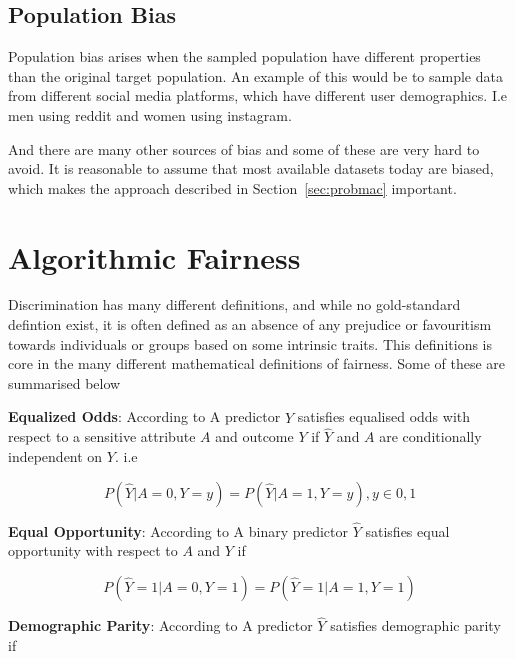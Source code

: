 \subsection{Population Bias}

Population bias arises when the sampled population have different properties than the original target population. \cite{Olteanu:2019:FDATA} An example of this would be to sample data from different social media platforms, which have different user demographics. I.e men using reddit and women using instagram.

And there are many other sources of bias and some of these are very hard to avoid. It is reasonable to assume that most available datasets today are biased, which makes the approach described in Section~\ref{sec:probmac} important.

\section{Algorithmic Fairness}

Discrimination has many different definitions, and while no gold-standard defintion exist, it is often defined as an absence of any prejudice or favouritism towards individuals or groups based on some intrinsic traits. \cite{Mehrabi:2021:CSUR, Nripsuta:2019:AIES} This definitions is core in the many different mathematical definitions of fairness. Some of these are summarised below

\textbf{Equalized Odds}: According to \citet{Mehrabi:2021:CSUR, Hardt:2016:NIPS} A predictor $\hat{Y}$ satisfies equalised odds with respect to a sensitive attribute $A$ and outcome $Y$ if $\hat{Y}$ and $A$ are conditionally independent on $Y$. i.e

\begin{equation*}
    P(\hat{Y}|A=0, Y=y) = P(\hat{Y}|A=1, Y=y), y \in {0, 1}
\end{equation*}

\textbf{Equal Opportunity}: According to \citet{Mehrabi:2021:CSUR, Hardt:2016:NIPS} A binary predictor $\hat{Y}$ satisfies equal opportunity with respect to $A$ and $Y$ if

\begin{equation*}
    P(\hat{Y}=1|A=0, Y=1) = P(\hat{Y}=1|A=1, Y=1)
\end{equation*}

\textbf{Demographic Parity}: According to \citet{Mehrabi:2021:CSUR, Dwork:2012:ITCS} A predictor $\hat{Y}$ satisfies demographic parity if 

